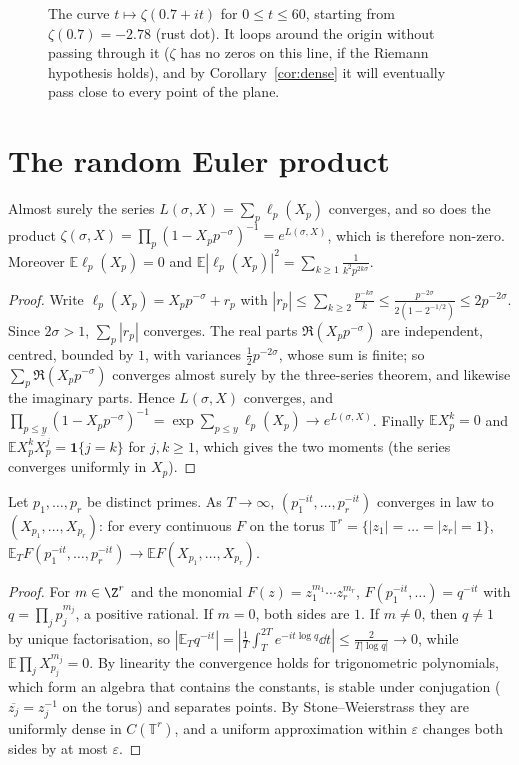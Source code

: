 \begin{figure}[ht]
\centering{}
\caption{The curve $t\mapsto\zeta(0.7+it)$ for $0\le t\le60$, starting from $\zeta(0.7)=-2.78$ (rust dot). It loops around the origin without passing through it ($\zeta$ has no zeros on this line, if the Riemann hypothesis holds), and by Corollary~\ref{cor:dense} it will eventually pass close to every point of the plane.}
\label{fig:zetacurve}
\end{figure}

\section{The random Euler product}

\begin{proposition}\label{prop:randomeuler}
Almost surely the series $L(\sigma,X)=\sum_p\ell_p(X_p)$ converges, and so does the product $\zeta(\sigma,X)=\prod_p(1-X_pp^{-\sigma})^{-1}=e^{L(\sigma,X)}$, which is therefore non-zero. Moreover $\mathbb E\ell_p(X_p)=0$ and $\mathbb E|\ell_p(X_p)|^2=\sum_{k\ge1}\frac1{k^2p^{2k\sigma}}$.
\end{proposition}
\begin{proof}
Write $\ell_p(X_p)=X_pp^{-\sigma}+r_p$ with $|r_p|\le\sum_{k\ge2}\frac{p^{-k\sigma}}k\le\frac{p^{-2\sigma}}{2(1-2^{-1/2})}\le2p^{-2\sigma}$. Since $2\sigma>1$, $\sum_p|r_p|$ converges. The real parts $\Re(X_pp^{-\sigma})$ are independent, centred, bounded by $1$, with variances $\frac12p^{-2\sigma}$, whose sum is finite; so $\sum_p\Re(X_pp^{-\sigma})$ converges almost surely by the three-series theorem, and likewise the imaginary parts. Hence $L(\sigma,X)$ converges, and $\prod_{p\le y}(1-X_pp^{-\sigma})^{-1}=\exp\sum_{p\le y}\ell_p(X_p)\to e^{L(\sigma,X)}$. Finally $\mathbb EX_p^k=0$ and $\mathbb EX_p^k\overline{X_p^j}=\mathbf 1\{j=k\}$ for $j,k\ge1$, which gives the two moments (the series converges uniformly in $X_p$).
\end{proof}

\begin{lemma}\label{lem:kw}
Let $p_1,\dots,p_r$ be distinct primes. As $T\to\infty$, $(p_1^{-it},\dots,p_r^{-it})$ converges in law to $(X_{p_1},\dots,X_{p_r})$: for every continuous $F$ on the torus $\mathbb T^r=\{|z_1|=\dots=|z_r|=1\}$, $\mathbb E_TF(p_1^{-it},\dots,p_r^{-it})\to\mathbb EF(X_{p_1},\dots,X_{p_r})$.
\end{lemma}
\begin{proof}
For $m\in\Z^r$ and the monomial $F(z)=z_1^{m_1}\cdots z_r^{m_r}$, $F(p_1^{-it},\dots)=q^{-it}$ with $q=\prod_jp_j^{m_j}$, a positive rational. If $m=0$, both sides are $1$. If $m\ne0$, then $q\ne1$ by unique factorisation, so $|\mathbb E_Tq^{-it}|=|\frac1T\int_T^{2T}e^{-it\log q}\dd t|\le\frac2{T|\log q|}\to0$, while $\mathbb E\prod_jX_{p_j}^{m_j}=0$. By linearity the convergence holds for trigonometric polynomials, which form an algebra that contains the constants, is stable under conjugation ($\overline{z_j}=z_j^{-1}$ on the torus) and separates points. By Stone--Weierstrass they are uniformly dense in $C(\mathbb T^r)$, and a uniform approximation within $\varepsilon$ changes both sides by at most $\varepsilon$.
\end{proof}

